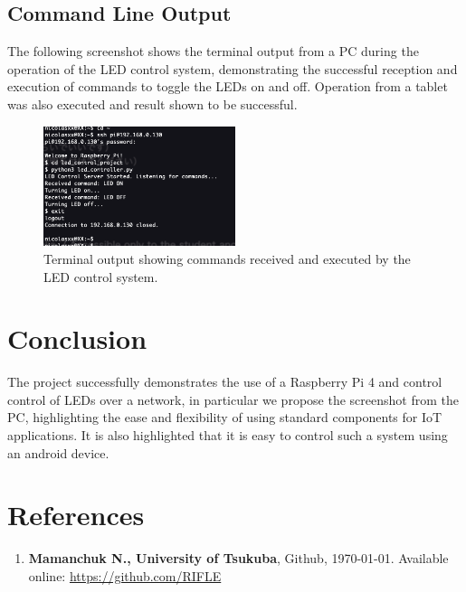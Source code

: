 \documentclass[12pt,a4paper]{article}
\begin{document}
\subsection{Command Line Output}
The following screenshot shows the terminal output from a PC during the operation of the LED control system, demonstrating the successful reception and execution of commands to toggle the LEDs on and off.
Operation from a tablet was also executed and result shown to be successful.

\begin{figure}[h]
\centering
\includegraphics[width=0.5\textwidth]{materials/terminal_output.jpg}
\caption{Terminal output showing commands received and executed by the LED control system.}
\end{figure}

\section{Conclusion}
The project successfully demonstrates the use of a Raspberry Pi 4 and control control of LEDs over a network, in particular we propose the screenshot from the PC, highlighting the ease and flexibility of using standard components for IoT applications.
It is also highlighted that it is easy to control such a system using an android device.

\section*{References}
\begin{enumerate}
    \item \textbf{Mamanchuk N., University of Tsukuba}, Github, \today. Available online: \url{https://github.com/RIFLE}
\end{enumerate}
\end{document}
